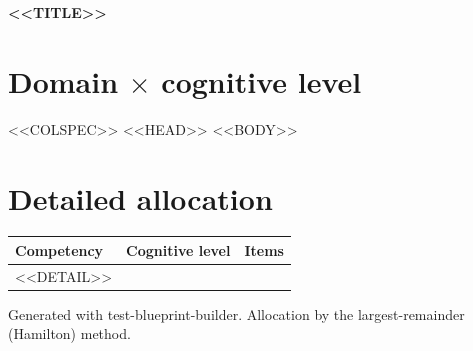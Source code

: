 \documentclass[11pt,a4paper]{article}
\begin{document}
{\color{primary}\LARGE\bfseries <<TITLE>>}\par
{}\par
\vspace{14pt}

\section*{Domain $\times$ cognitive level}
\begin{center}
\begin{tabular}{<<COLSPEC>>}
\toprule
<<HEAD>>
\midrule
<<BODY>>
\bottomrule
\end{tabular}
\end{center}

\section*{Detailed allocation}
\begin{longtable}{llr}
\toprule
\textbf{Competency} & \textbf{Cognitive level} & \textbf{Items} \\
\midrule
\endhead
<<DETAIL>>
\bottomrule
\end{longtable}

\vfill
{\footnotesize\color{gray} Generated with test-blueprint-builder. Allocation by the largest-remainder (Hamilton) method.}
\end{document}
